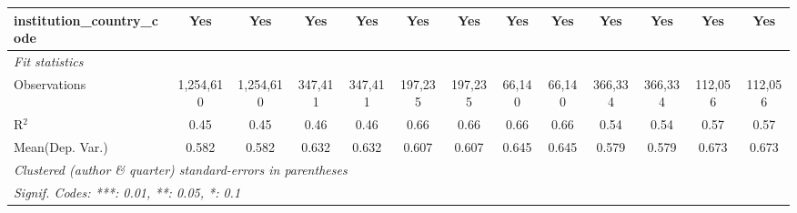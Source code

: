 \begin{tabular}{lcccccccccccc}
   institution\_country\_code               & Yes           & Yes           & Yes           & Yes           & Yes          & Yes             & Yes          & Yes             & Yes           & Yes           & Yes           & Yes\\  
   \midrule
   \emph{Fit statistics}\\
   Observations                             & 1,254,610     & 1,254,610     & 347,411       & 347,411       & 197,235      & 197,235         & 66,140       & 66,140          & 366,334       & 366,334       & 112,056       & 112,056\\  
   R$^2$                                    & 0.45          & 0.45          & 0.46          & 0.46          & 0.66         & 0.66            & 0.66         & 0.66            & 0.54          & 0.54          & 0.57          & 0.57\\  
Mean(Dep. Var.) & 0.582 & 0.582 & 0.632 & 0.632 & 0.607 & 0.607 & 0.645 & 0.645 & 0.579 & 0.579 & 0.673 & 0.673 \\
   \midrule \midrule
   \multicolumn{13}{l}{\emph{Clustered (author \& quarter) standard-errors in parentheses}}\\
   \multicolumn{13}{l}{\emph{Signif. Codes: ***: 0.01, **: 0.05, *: 0.1}}\\
\end{tabular}
\par\endgroup
